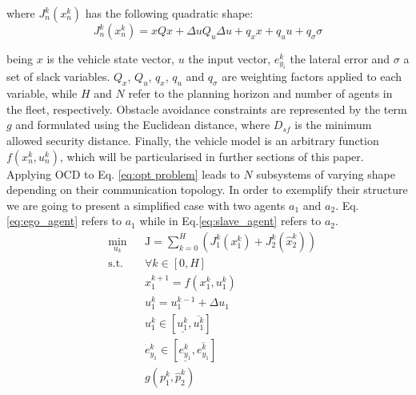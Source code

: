 \documentclass[letterpaper, 10 pt, conference]{ieeeconf}  %
\begin{document}
\noindent where $J^k_n(x^k_n)$ has the following quadratic shape:
\begin{equation}
    J^k_n(x^k_n) = xQx + \Delta u Q_u \Delta u + q_xx + q_uu + q_{\sigma}\sigma
\end{equation}

being $x$ is the vehicle state vector, $u$ the input vector, $e_{y_{i}}^{k}$ the lateral error and $\sigma$ a set of slack variables. $Q_x$, $Q_u$, $q_x$, $q_u$ and $q_{\sigma}$ are weighting factors applied to each variable, while $H$ and $N$ refer to the planning horizon and number of agents in the fleet, respectively. Obstacle avoidance constraints are represented by the term $g$ and formulated using the Euclidean distance, where $D_{sf}$ is the minimum allowed security distance. Finally, the vehicle model is an arbitrary function $f(x^{k}_n,u^{k}_n)$, which will be particularised in further sections of this paper.  \\ 

Applying OCD to Eq. \eqref{eq:opt problem} leads to $N$ subsystems of varying shape depending on their communication topology. In order to exemplify their structure we are going to present a simplified case with two agents $a_1$ and $a_2$. Eq. \eqref{eq:ego_agent} refers to $a_1$ while in Eq.\eqref{eq:slave_agent} refers to $a_2$. \\

\begin{equation}
\label{eq:ego_agent}
\begin{aligned}
    & \underset{u_k}{\text{min}} && \mathrm{J}=\sum_{k=0}^{H} ( J^k_1(x^k_1) + J^k_2(\hat{x}^k_2))\\
    & \text{s.t.} &&\forall k \in [0,H]\\
    & && x^{k+1}_1 = f(x^{k}_1,u^{k}_1)\\
    & && u^k_1 = u^{k-1}_{1} + \Delta u_1 \\ 
    & && u^k_1 \in [\underline{u^k_1}, \overline{u^k_1} ] \\
    & && e_{y_{1}}^{k} \in [\underline{e_{y_{1}}^{k}}, \overline{e_{y_{1}}^{k}} ] \\
    & && g(p^k_1,\hat{p}^k_2) \\

\end{aligned}
\end{equation}
\end{document}
